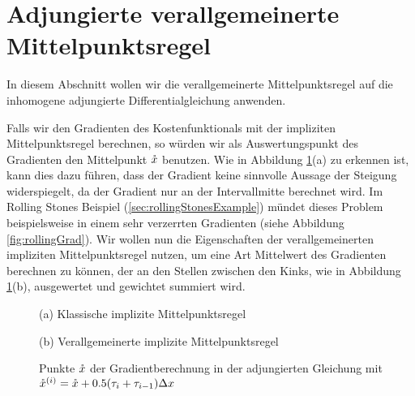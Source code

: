 \section{Adjungierte verallgemeinerte Mittelpunktsregel}

In diesem Abschnitt wollen wir die verallgemeinerte Mittelpunktsregel auf die inhomogene adjungierte Differentialgleichung anwenden.

Falls wir den Gradienten des Kostenfunktionals mit der impliziten Mittelpunktsregel berechnen, so würden wir als Auswertungspunkt des Gradienten den Mittelpunkt $\mathring{x}$ benutzen. Wie in Abbildung \ref{fig:multipleKinksAdjoint}(a) zu erkennen ist, kann dies dazu führen, dass der Gradient keine sinnvolle Aussage der Steigung widerspiegelt, da der Gradient nur an der Intervallmitte berechnet wird. Im Rolling Stones Beispiel (\ref{sec:rollingStonesExample}) mündet dieses Problem beispielsweise in einem sehr verzerrten Gradienten (siehe Abbildung \ref{fig:rollingGrad}). Wir wollen nun die Eigenschaften der verallgemeinerten impliziten Mittelpunktsregel nutzen, um eine Art Mittelwert des Gradienten berechnen zu können, der an den Stellen zwischen den Kinks, wie in Abbildung \ref{fig:multipleKinksAdjoint}(b), ausgewertet und gewichtet summiert wird. 

\begin{figure}[ht]
\footnotesize
\centering
\begin{minipage}[b]{\linewidth}

\caption*{(a) Klassische implizite Mittelpunktsregel}
\end{minipage}
\begin{minipage}[b]{\linewidth}

\caption*{(b) Verallgemeinerte implizite Mittelpunktsregel}
\end{minipage}
\caption{Punkte $\mathring{x}$ der Gradientberechnung in der adjungierten Gleichung mit $\mathring{x}^{(i)} = \mathring{x} + 0.5(\tau_i+\tau_{i-1})\Delta x$}
\label{fig:multipleKinksAdjoint}
\end{figure}


